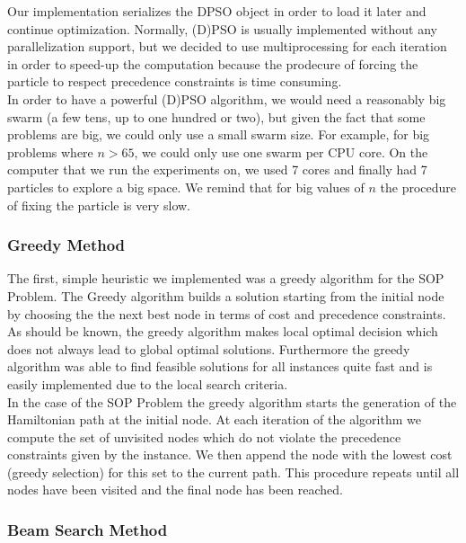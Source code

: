 \documentclass[]{article}
\begin{document}
	Our implementation serializes the DPSO object in order to load it later and continue optimization. Normally, (D)PSO is usually implemented 
	without any parallelization support, but we decided to use multiprocessing for each iteration in order to speed-up the computation because the 
	prodecure of forcing the particle to respect precedence constraints is time consuming. \\
	
	In order to have a powerful (D)PSO algorithm, we would need a reasonably big swarm (a few tens, up to one hundred or two), but given the fact 
	that some problems are big, we could only use a small swarm size. For example, for big problems where $ n > 65 $, we could only use one swarm per 
	CPU core. On the computer that we run the experiments on, we used 7 cores and finally had 7 particles to explore a big space. We remind that for 
	big values of $ n $ the procedure of fixing the particle is very slow.

    \subsubsection{Greedy Method}

   	The first, simple heuristic we implemented was a greedy algorithm for the SOP Problem. The Greedy algorithm builds a solution starting from the initial node by choosing the the next best node in terms of cost and precedence constraints. As should be known, the greedy algorithm makes local optimal decision which does not always lead to global optimal solutions. Furthermore the greedy algorithm was able to find feasible solutions for all instances quite fast and is easily implemented due to the local search criteria. \cite{Cormen2009} \\

   	In the case of the SOP Problem the greedy algorithm starts the generation of the Hamiltonian path at the initial node. At each iteration of the 
   	algorithm we compute the set of unvisited nodes which do not violate the precedence constraints given by the instance. We then append the node 
   	with the lowest cost (greedy selection) for this set to the current path. This procedure repeats until all nodes have been visited and the final 
   	node has been reached.

    \subsubsection{Beam Search Method}
\end{document}
